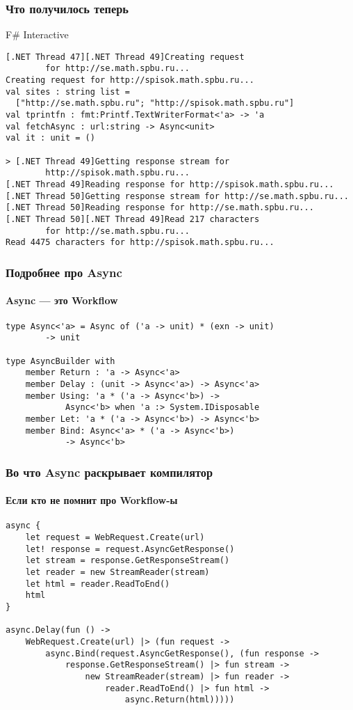 \documentclass[xetex,mathserif,serif]{beamer}
\begin{document}
	\begin{frame}[fragile]
		\frametitle{Что получилось теперь}
		\begin{footnotesize}
			\begin{alertblock}{F\# Interactive}
				\begin{verbatim}
[.NET Thread 47][.NET Thread 49]Creating request 
        for http://se.math.spbu.ru...
Creating request for http://spisok.math.spbu.ru...
val sites : string list =
  ["http://se.math.spbu.ru"; "http://spisok.math.spbu.ru"]
val tprintfn : fmt:Printf.TextWriterFormat<'a> -> 'a
val fetchAsync : url:string -> Async<unit>
val it : unit = ()

> [.NET Thread 49]Getting response stream for 
        http://spisok.math.spbu.ru...
[.NET Thread 49]Reading response for http://spisok.math.spbu.ru...
[.NET Thread 50]Getting response stream for http://se.math.spbu.ru...
[.NET Thread 50]Reading response for http://se.math.spbu.ru...
[.NET Thread 50][.NET Thread 49]Read 217 characters 
        for http://se.math.spbu.ru...
Read 4475 characters for http://spisok.math.spbu.ru...
				\end{verbatim}
			\end{alertblock}
		\end{footnotesize}
	\end{frame}

	\begin{frame}[fragile]
		\frametitle{Подробнее про Async}
		\framesubtitle{Async --- это Workflow}
		\begin{verbatim}
type Async<'a> = Async of ('a -> unit) * (exn -> unit) 
        -> unit

type AsyncBuilder with
    member Return : 'a -> Async<'a>
    member Delay : (unit -> Async<'a>) -> Async<'a>
    member Using: 'a * ('a -> Async<'b>) -> 
            Async<'b> when 'a :> System.IDisposable
    member Let: 'a * ('a -> Async<'b>) -> Async<'b>
    member Bind: Async<'a> * ('a -> Async<'b>) 
            -> Async<'b>
		\end{verbatim}
	\end{frame}

	\begin{frame}[fragile]
		\frametitle{Во что Async раскрывает компилятор}
		\framesubtitle{Если кто не помнит про Workflow-ы}
		\begin{footnotesize}
			\begin{verbatim}
async { 
    let request = WebRequest.Create(url)
    let! response = request.AsyncGetResponse()
    let stream = response.GetResponseStream()
    let reader = new StreamReader(stream)
    let html = reader.ReadToEnd()
    html
} 

async.Delay(fun () ->
    WebRequest.Create(url) |> (fun request ->
        async.Bind(request.AsyncGetResponse(), (fun response ->
            response.GetResponseStream() |> fun stream ->
                new StreamReader(stream) |> fun reader ->
                    reader.ReadToEnd() |> fun html ->
                        async.Return(html)))))
			\end{verbatim}
		\end{footnotesize}
	\end{frame}
\end{document}
